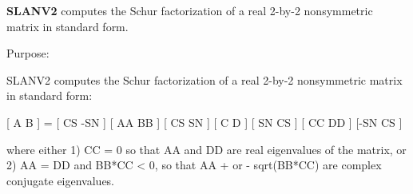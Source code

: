 {\bfseries S\+L\+A\+N\+V2} computes the Schur factorization of a real 2-\/by-\/2 nonsymmetric matrix in standard form. 

 \begin{DoxyParagraph}{Purpose\+: }
\begin{DoxyVerb} SLANV2 computes the Schur factorization of a real 2-by-2 nonsymmetric
 matrix in standard form:

      [ A  B ] = [ CS -SN ] [ AA  BB ] [ CS  SN ]
      [ C  D ]   [ SN  CS ] [ CC  DD ] [-SN  CS ]

 where either
 1) CC = 0 so that AA and DD are real eigenvalues of the matrix, or
 2) AA = DD and BB*CC < 0, so that AA + or - sqrt(BB*CC) are complex
 conjugate eigenvalues.\end{DoxyVerb}
 
\end{DoxyParagraph}

